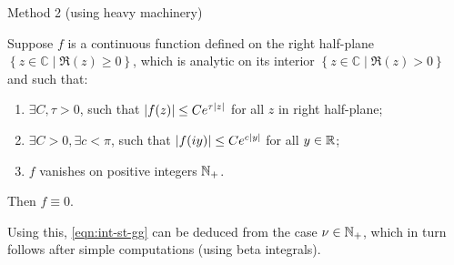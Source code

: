 \documentclass[pdf,notes]{beamer}
\begin{document}
\begin{frame}{Method 2 (using heavy machinery)}
	\begin{fact}
		Suppose $f$ is a continuous function defined on the right half-plane $\left\{ z\in\mathbb{C}\mid \Re(z)\ge0 \right\}$, which
		is analytic on its interior $\left\{ z\in\mathbb{C}\mid\Re(z)>0 \right\}$ and such that:\begin{enumerate}
			\item $\exists C,\tau>0$, such that $\left|f(z)\right|\le C e^{\tau\left|z\right|}$ for all $z$ in right half-plane;
			\item $\exists C>0,\exists c<\pi$, such that $\left|f(iy)\right|\le Ce^{c\left|y\right|}$ for all $y\in\mathbb{R}$;
			\item $f$ vanishes on positive integers $\mathbb{N}_+$.
		\end{enumerate}
		Then $f\equiv0$.
	\end{fact}
	Using this, \eqref{eqn:int-st-gg} can be deduced from the case $\nu\in\mathbb{N}_{+}$, which in turn follows after simple computations (using beta integrals).
\end{frame}
\end{document}
